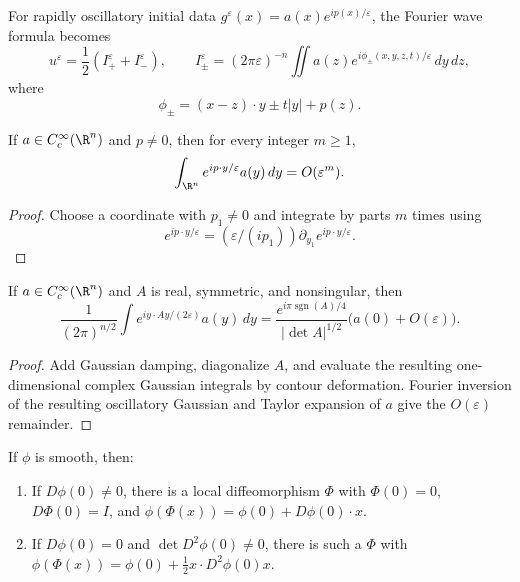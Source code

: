 \begin{example}
\label{ex:stationary-phase-wave-equation}
For rapidly oscillatory initial data $g^\varepsilon(x)=a(x)e^{ip(x)/\varepsilon}$,
the Fourier wave formula becomes
\[
u^\varepsilon=\frac12(I_+^\varepsilon+I_-^\varepsilon),\qquad
I_\pm^\varepsilon=(2\pi\varepsilon)^{-n}
\iint a(z)e^{i\phi_\pm(x,y,z,t)/\varepsilon}\,dy\,dz,
\]
where
\[
\phi_\pm=(x-z)\cdot y\pm t|y|+p(z).
\]
\end{example}

\begin{lemma}
\label{lem:stationary-phase-linear-asymptotics}
If $a\in C_c^\infty(\R^n)$ and $p\ne0$, then for every integer $m\ge1$,
\[
\int_{\R^n}e^{ip\cdot y/\varepsilon}a(y)\,dy=O(\varepsilon^m).
\]
\end{lemma}

\begin{proof}
\sketch Choose a coordinate with $p_1\ne0$ and integrate by parts $m$ times
using
\[
e^{ip\cdot y/\varepsilon}=(\varepsilon/(ip_1))\partial_{y_1}
e^{ip\cdot y/\varepsilon}.
\]
\end{proof}

\begin{lemma}
\label{lem:stationary-phase-quadratic-asymptotics}
If $a\in C_c^\infty(\R^n)$ and $A$ is real, symmetric, and nonsingular, then
\[
\frac1{(2\pi)^{n/2}}\int e^{iy\cdot Ay/(2\varepsilon)}a(y)\,dy
=\frac{e^{i\pi\operatorname{sgn}(A)/4}}{|\det A|^{1/2}}
\big(a(0)+O(\varepsilon)\big).
\]
\end{lemma}

\begin{proof}
\sketch Add Gaussian damping, diagonalize $A$, and evaluate the resulting
one-dimensional complex Gaussian integrals by contour deformation. Fourier
inversion of the resulting oscillatory Gaussian and Taylor expansion of $a$
give the $O(\varepsilon)$ remainder.
\end{proof}

\begin{lemma}
\label{lem:stationary-phase-changing-coordinates}
If $\phi$ is smooth, then:
\begin{enumerate}
\item If $D\phi(0)\ne0$, there is a local diffeomorphism $\Phi$ with
$\Phi(0)=0$, $D\Phi(0)=I$, and
$\phi(\Phi(x))=\phi(0)+D\phi(0)\cdot x$.
\item If $D\phi(0)=0$ and $\det D^2\phi(0)\ne0$, there is such a $\Phi$ with
$\phi(\Phi(x))=\phi(0)+\frac12x\cdot D^2\phi(0)x$.
\end{enumerate}
\end{lemma}

